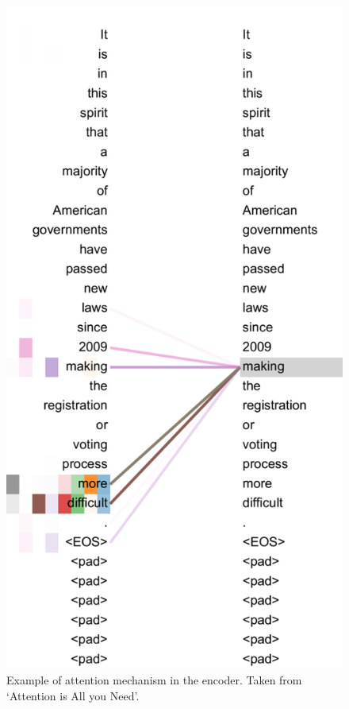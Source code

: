 \begin{figure}[H]
    \begin{minipage}{0.425\textwidth}
        \centering
        \includegraphics[width=\textwidth]{project/img/attention.png}
        \caption{Example of attention mechanism in the encoder. Taken from `Attention is All you Need'.\cite{attention}}

\end{minipage}
\end{figure}
